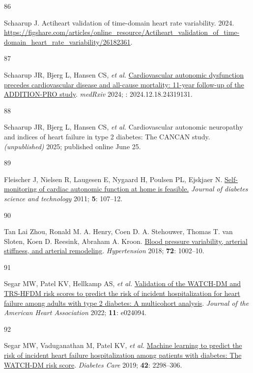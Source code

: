\documentclass[
  a4paper,
  headsepline=true,
  open=any]{scrbook}
\newlength{\cslhangindent}
\newlength{\csllabelwidth}
\newlength{\cslentryspacingunit} %
\newenvironment{CSLReferences}[2] %
 {%
  \setlength{\parindent}{0pt}
  \ifodd #1
  \let\oldpar\par
  \def\par{\hangindent=\cslhangindent\oldpar}
  \fi
  \setlength{\parskip}{#2\cslentryspacingunit}
 }%
 {}
\newcommand{\CSLLeftMargin}[1]{\parbox[t]{\csllabelwidth}{#1}}
\newcommand{\CSLRightInline}[1]{\parbox[t]{\linewidth - \csllabelwidth}{#1}\break}
\begin{document}
\begin{CSLReferences}{0}{0}
\leavevmode{}%
\CSLLeftMargin{86 }%
\CSLRightInline{Schaarup J. Actiheart validation of time-domain heart
rate variability. 2024.
\url{https://figshare.com/articles/online_resource/Actiheart_validation_of_time-domain_heart_rate_variability/26182361}.}

\leavevmode{}%
\CSLLeftMargin{87 }%
\CSLRightInline{Schaarup JR, Bjerg L, Hansen CS, \emph{et al.}
\href{https://doi.org/10.1101/2024.12.18.24319131}{Cardiovascular
autonomic dysfunction precedes cardiovascular disease and all-cause
mortality: 11-year follow-up of the ADDITION-PRO study}. \emph{medRxiv}
2024; : 2024.12.18.24319131.}

\leavevmode{}%
\CSLLeftMargin{88 }%
\CSLRightInline{Schaarup JR, Bjerg L, Hansen CS, \emph{et al.}
Cardiovascular autonomic neuropathy and indices of heart failure in type
2 diabetes: The CANCAN study. \emph{(unpublished)} 2025; published
online June 25.}

\leavevmode{}%
\CSLLeftMargin{89 }%
\CSLRightInline{Fleischer J, Nielsen R, Laugesen E, Nygaard H, Poulsen
PL, Ejskjaer N.
\href{https://doi.org/10.1177/193229681100500115}{Self-monitoring of
cardiac autonomic function at home is feasible.} \emph{Journal of
diabetes science and technology} 2011; \textbf{5}: 107--12.}

\leavevmode{}%
\CSLLeftMargin{90 }%
\CSLRightInline{Tan Lai Zhou, Ronald M. A. Henry, Coen D. A. Stehouwer,
Thomas T. van Sloten, Koen D. Reesink, Abraham A. Kroon.
\href{https://doi.org/doi:10.1161/HYPERTENSIONAHA.118.11325}{Blood
pressure variability, arterial stiffness, and arterial remodeling}.
\emph{Hypertension} 2018; \textbf{72}: 1002--10.}

\leavevmode{}%
\CSLLeftMargin{91 }%
\CSLRightInline{Segar MW, Patel KV, Hellkamp AS, \emph{et al.}
\href{https://doi.org/10.1161/JAHA.121.024094}{Validation of the
WATCH{-}DM and TRS{-}HFDM risk scores to predict the risk of incident
hospitalization for heart failure among adults with type 2 diabetes: A
multicohort analysis}. \emph{Journal of the American Heart Association}
2022; \textbf{11}: e024094.}

\leavevmode{}%
\CSLLeftMargin{92 }%
\CSLRightInline{Segar MW, Vaduganathan M, Patel KV, \emph{et al.}
\href{https://doi.org/10.2337/dc19-0587}{Machine learning to predict the
risk of incident heart failure hospitalization among patients with
diabetes: The WATCH-DM risk score}. \emph{Diabetes Care} 2019;
\textbf{42}: 2298--306.}


\end{CSLReferences}
\end{document}

